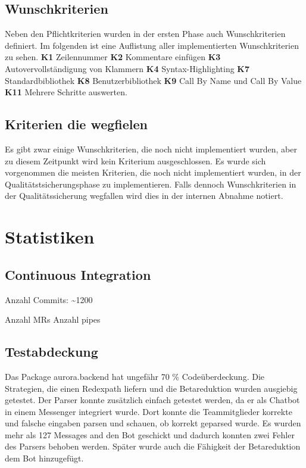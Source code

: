 \documentclass[parskip=full,11pt,twoside]{scrartcl}
\begin{document}
\subsection{Wunschkriterien}
Neben den Pflichtkriterien wurden in der ersten Phase auch Wunschkriterien definiert.
Im folgenden ist eine Auflistung aller implementierten Wunschkriterien zu sehen.
\newline
\newline
\textbf{K1} Zeilennummer
\newline
\textbf{K2} Kommentare einfügen
\newline
\textbf{K3} Autovervollständigung von Klammern
\newline
\textbf{K4} Syntax-Highlighting
\newline
\textbf{K7} Standardbibliothek
\newline
\textbf{K8} Benutzerbibliothek
\bigbreak
\textbf{K9} Call By Name und Call By Value
\smallbreak
\textbf{K11} Mehrere Schritte auswerten.
\newline

\subsection{Kriterien die wegfielen}
Es gibt zwar einige Wunschkriterien, die noch nicht implementiert wurden,
aber zu diesem Zeitpunkt wird kein Kriterium ausgeschlossen. Es wurde sich
vorgenommen die meisten Kriterien, die noch nicht implementiert wurden,
in der Qualitätstsicherungsphase zu implementieren.
Falls dennoch Wunschkriterien in der Qualitätssicherung wegfallen wird dies in der internen Abnahme notiert.
\newpage


\section{Statistiken}

\subsection{Continuous Integration}
Anzahl Commits: \textasciitilde  1200\newline

Anzahl MRs\newline
Anzahl pipes\newline


\subsection{Testabdeckung}
Das Package aurora.backend hat ungefähr 70 \% Codeüberdeckung.
Die Strategien, die einen Redexpath liefern und die Betareduktion wurden ausgiebig getestet.
Der Parser konnte zusätzlich einfach getestet werden, da er als Chatbot in einem Messenger integriert wurde.
Dort konnte die Teammitglieder korrekte und falsche eingaben parsen und schauen,
ob korrekt geparsed wurde.
Es wurden mehr als 127 Messages and den Bot geschickt und dadurch konnten zwei
Fehler des Parsers behoben werden.
Später wurde auch die Fähigkeit der Betareduktion dem Bot hinzugefügt.
\newpage
\end{document}
